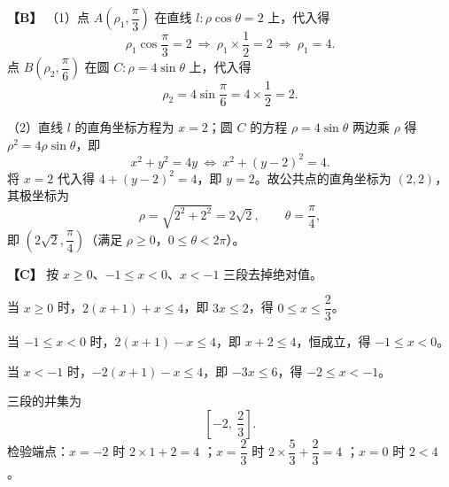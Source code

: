 \begin{answer}
\textbf{【B】} （1）点 $A\left(\rho_1,\dfrac\pi3\right)$ 在直线 $l:\rho\cos\theta=2$ 上，代入得
\nopagebreak[4]
\[\rho_1\cos\frac\pi3=2\ \Longrightarrow\ \rho_1\times\frac12=2\ \Longrightarrow\ \rho_1=4 .\]
点 $B\left(\rho_2,\dfrac\pi6\right)$ 在圆 $C:\rho=4\sin\theta$ 上，代入得
\nopagebreak[4]
\[\rho_2=4\sin\frac\pi6=4\times\frac12=2 .\]

（2）直线 $l$ 的直角坐标方程为 $x=2$；圆 $C$ 的方程 $\rho=4\sin\theta$ 两边乘 $\rho$ 得 $\rho^2=4\rho\sin\theta$，即
\nopagebreak[4]
\[x^2+y^2=4y\ \Longleftrightarrow\ x^2+(y-2)^2=4 .\]
将 $x=2$ 代入得 $4+(y-2)^2=4$，即 $y=2$。故公共点的直角坐标为 $(2,2)$，其极坐标为
\nopagebreak[4]
\[\rho=\sqrt{2^2+2^2}=2\sqrt2,\qquad \theta=\frac\pi4,\]
即 $\left(2\sqrt2,\dfrac\pi4\right)$（满足 $\rho\geqslant0$，$0\leqslant\theta<2\pi$）。

\textbf{【C】} 按 $x\geqslant0$、$-1\leqslant x<0$、$x<-1$ 三段去掉绝对值。

当 $x\geqslant0$ 时，$2(x+1)+x\leqslant4$，即 $3x\leqslant2$，得 $0\leqslant x\leqslant\dfrac23$。

当 $-1\leqslant x<0$ 时，$2(x+1)-x\leqslant4$，即 $x+2\leqslant4$，恒成立，得 $-1\leqslant x<0$。

当 $x<-1$ 时，$-2(x+1)-x\leqslant4$，即 $-3x\leqslant6$，得 $-2\leqslant x<-1$。

三段的并集为
\nopagebreak[4]
\[\left[-2,\ \frac23\right].\]
检验端点：$x=-2$ 时 $2\times1+2=4$ ；$x=\dfrac23$ 时 $2\times\dfrac53+\dfrac23=4$ ；$x=0$ 时 $2<4$ 。


\end{answer}
